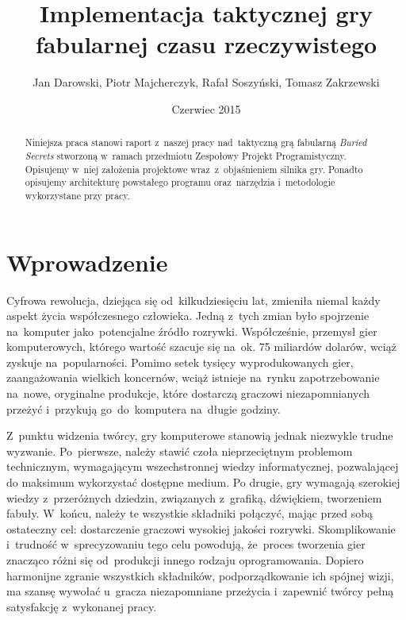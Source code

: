 \documentclass[licencjacka]{pracamgr}
\author	{Jan Darowski, Piotr Majcherczyk, Rafał Soszyński, Tomasz Zakrzewski}
\title{Implementacja taktycznej gry fabularnej czasu rzeczywistego}
\date{Czerwiec 2015}
\begin{document}
\maketitle

\begin{abstract}
  Niniejsza praca stanowi raport z~naszej pracy nad~taktyczną grą fabularną \emph{Buried Secrets} stworzoną w~ramach przedmiotu Zespołowy Projekt
  Programistyczny. Opisujemy w~niej założenia projektowe wraz~z~objaśnieniem silnika gry. Ponadto opisujemy architekturę 
  powstałego programu oraz~narzędzia i~metodologie wykorzystane przy pracy.
\end{abstract}

\tableofcontents

\chapter*{Wprowadzenie}
  Cyfrowa rewolucja, dziejąca się od~kilkudziesięciu lat, zmieniła niemal każdy aspekt życia współczesnego człowieka.
  Jedną z~tych zmian było spojrzenie na~komputer jako~potencjalne źródło rozrywki. Współcześnie, przemysł
  gier komputerowych, którego wartość szacuje się na~ok. 75 miliardów dolarów\cite{CA}, wciąż zyskuje na~popularności.
  Pomimo setek tysięcy wyprodukowanych gier, zaangażowania wielkich koncernów, wciąż istnieje na~rynku zapotrzebowanie
  na~nowe, oryginalne produkcje, które dostarczą graczowi niezapomnianych przeżyć i~przykują go~do~komputera na~długie godziny.

  Z~punktu widzenia twórcy, gry komputerowe stanowią jednak niezwykle trudne wyzwanie. Po~pierwsze, należy stawić czoła
  nieprzeciętnym problemom technicznym, wymagającym wszechstronnej wiedzy informatycznej, pozwalającej do maksimum wykorzystać
  dostępne medium. Po drugie, gry wymagają szerokiej wiedzy z~przeróżnych dziedzin, związanych
  z~grafiką, dźwiękiem, tworzeniem fabuły. W~końcu, należy te wszystkie składniki połączyć, mając przed sobą ostateczny cel: dostarczenie
  graczowi wysokiej jakości rozrywki. Skomplikowanie i~trudność w~sprecyzowaniu tego celu powodują, że~proces tworzenia gier
  znacząco różni się od~produkcji innego rodzaju oprogramowania. Dopiero harmonijne zgranie wszystkich składników, podporządkowanie
  ich spójnej wizji, ma szansę wywołać u~gracza niezapomniane przeżycia i~zapewnić twórcy pełną satysfakcję z~wykonanej pracy.
\end{document}
